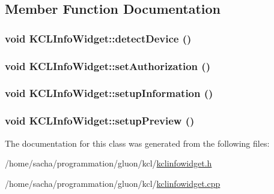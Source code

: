 \subsection{Member Function Documentation}
\hypertarget{class_k_c_l_info_widget_df73eaa8bd4c3f8f7c5748c201f03a84}{
\subsubsection[{detectDevice}]{\setlength{\rightskip}{0pt plus 5cm}void KCLInfoWidget::detectDevice ()}}
\label{class_k_c_l_info_widget_df73eaa8bd4c3f8f7c5748c201f03a84}


\hypertarget{class_k_c_l_info_widget_b7f7f09972a7e342f29f222bdff11705}{
\subsubsection[{setAuthorization}]{\setlength{\rightskip}{0pt plus 5cm}void KCLInfoWidget::setAuthorization ()}}
\label{class_k_c_l_info_widget_b7f7f09972a7e342f29f222bdff11705}


\hypertarget{class_k_c_l_info_widget_313172b736bb1598e01443aa538fce20}{
\subsubsection[{setupInformation}]{\setlength{\rightskip}{0pt plus 5cm}void KCLInfoWidget::setupInformation ()}}
\label{class_k_c_l_info_widget_313172b736bb1598e01443aa538fce20}


\hypertarget{class_k_c_l_info_widget_64ab942e6b535ad68695be814466745a}{
\subsubsection[{setupPreview}]{\setlength{\rightskip}{0pt plus 5cm}void KCLInfoWidget::setupPreview ()}}
\label{class_k_c_l_info_widget_64ab942e6b535ad68695be814466745a}




The documentation for this class was generated from the following files:\begin{CompactItemize}
\item 
/home/sacha/programmation/gluon/kcl/\hyperlink{kclinfowidget_8h}{kclinfowidget.h}\item 
/home/sacha/programmation/gluon/kcl/\hyperlink{kclinfowidget_8cpp}{kclinfowidget.cpp}\end{CompactItemize}
